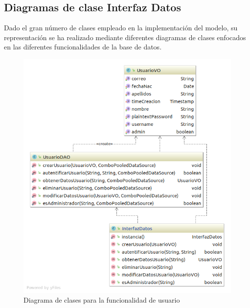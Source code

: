 \documentclass[]{article}
\begin{document}
\subsection*{Diagramas de clase Interfaz Datos}
Dado el gran número de clases empleado en la implementación del modelo, su representación se ha realizado mediante diferentes diagramas de clases enfocados en las diferentes funcionalidades de la base de datos.
\begin{figure}[H]
\centering
\includegraphics[scale = 0.5]{figuras/base_datos/clasesUsuario.png}
\caption{Diagrama de clases para la funcionalidad de usuario}
\label{fig:diagramaClasesUsuario}
\end{figure}
\end{document}
